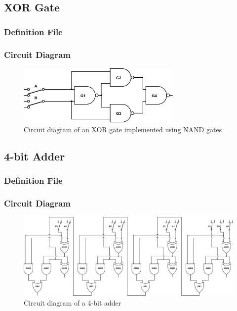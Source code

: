 \documentclass[a4paper,10pt]{article}
\begin{document}
\subsection{XOR Gate}
\subsubsection{Definition File}

\subsubsection{Circuit Diagram}
\begin{figure}[h]
 \centering
 \includegraphics[width=8cm]{../../examples/xor.png}
 \caption{Circuit diagram of an XOR gate implemented using NAND gates}
 \label{fig:example-xor}
\end{figure}

\subsection{4-bit Adder}
\subsubsection{Definition File}

\subsubsection{Circuit Diagram}
\begin{figure}[h]
 \centering
 \includegraphics[width=16cm]{../../examples/4-bit-adder.png}
 \caption{Circuit diagram of a 4-bit adder}
 \label{fig:example-adder}
\end{figure}
\end{document}
